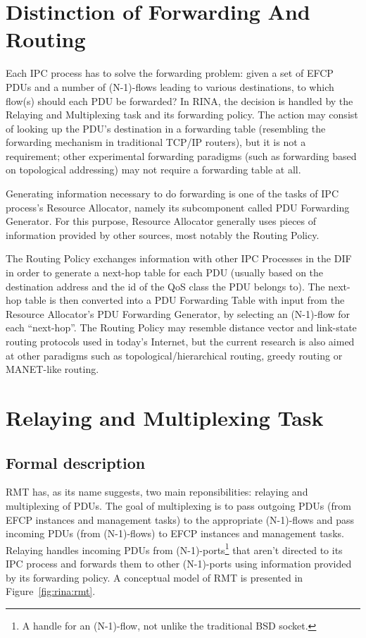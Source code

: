     \section{Distinction of Forwarding And Routing}

        Each IPC process has to solve the forwarding problem: given a set of EFCP PDUs and a number of (N-1)-flows leading to various destinations, to which flow(s) should each PDU be forwarded? In RINA, the decision is handled by the Relaying and Multiplexing task and its forwarding policy. The action may consist of looking up the PDU's destination in a forwarding table (resembling the forwarding mechanism in traditional TCP/IP routers), but it is not a requirement; other experimental forwarding paradigms (such as forwarding based on topological addressing) may not require a forwarding table at all.

        Generating information necessary to do forwarding is one of the tasks of IPC process's Resource Allocator, namely its subcomponent called PDU Forwarding Generator. For this purpose, Resource Allocator generally uses pieces of information provided by other sources, most notably the Routing Policy.

        The Routing Policy exchanges information with other IPC Processes in the DIF in order to generate a next-hop table for each PDU (usually based on the destination address and the id of the QoS class the PDU belongs to). The next-hop table is then converted into a PDU Forwarding Table with input from the Resource Allocator's PDU Forwarding Generator, by selecting an (N-1)-flow for each ``next-hop''. The Routing Policy may resemble distance vector and link-state routing protocols used in today's Internet, but the current research is also aimed at other paradigms such as topological/hierarchical routing, greedy routing or MANET-like routing.


    \section{Relaying and Multiplexing Task}

        \subsection{Formal description}

            RMT has, as its name suggests, two main reponsibilities: relaying and multiplexing of PDUs. The goal of multiplexing is to pass outgoing PDUs (from EFCP instances and management tasks) to the appropriate (N-1)-flows and pass incoming PDUs (from (N-1)-flows) to EFCP instances and management tasks. Relaying handles incoming PDUs from (N-1)-ports\footnote{A handle for an (N-1)-flow, not unlike the traditional BSD socket.} that aren't directed to its IPC process and forwards them to other (N-1)-ports using information provided by its forwarding policy. A conceptual model of RMT is presented in Figure~\ref{fig:rina:rmt}.

